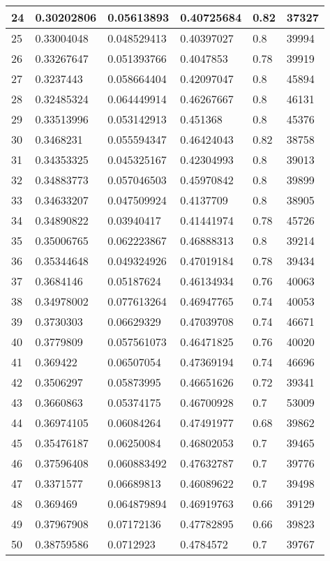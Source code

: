 \begin{longtable}{|l|l|l|l|l|l|}
24 & 0.30202806 & 0.05613893 & 0.40725684 & 0.82 & 37327 \\ \hline 
25 & 0.33004048 & 0.048529413 & 0.40397027 & 0.8 & 39994 \\ \hline 
26 & 0.33267647 & 0.051393766 & 0.4047853 & 0.78 & 39919 \\ \hline 
27 & 0.3237443 & 0.058664404 & 0.42097047 & 0.8 & 45894 \\ \hline 
28 & 0.32485324 & 0.064449914 & 0.46267667 & 0.8 & 46131 \\ \hline 
29 & 0.33513996 & 0.053142913 & 0.451368 & 0.8 & 45376 \\ \hline 
30 & 0.3468231 & 0.055594347 & 0.46424043 & 0.82 & 38758 \\ \hline 
31 & 0.34353325 & 0.045325167 & 0.42304993 & 0.8 & 39013 \\ \hline 
32 & 0.34883773 & 0.057046503 & 0.45970842 & 0.8 & 39899 \\ \hline 
33 & 0.34633207 & 0.047509924 & 0.4137709 & 0.8 & 38905 \\ \hline 
34 & 0.34890822 & 0.03940417 & 0.41441974 & 0.78 & 45726 \\ \hline 
35 & 0.35006765 & 0.062223867 & 0.46888313 & 0.8 & 39214 \\ \hline 
36 & 0.35344648 & 0.049324926 & 0.47019184 & 0.78 & 39434 \\ \hline 
37 & 0.3684146 & 0.05187624 & 0.46134934 & 0.76 & 40063 \\ \hline 
38 & 0.34978002 & 0.077613264 & 0.46947765 & 0.74 & 40053 \\ \hline 
39 & 0.3730303 & 0.06629329 & 0.47039708 & 0.74 & 46671 \\ \hline 
40 & 0.3779809 & 0.057561073 & 0.46471825 & 0.76 & 40020 \\ \hline 
41 & 0.369422 & 0.06507054 & 0.47369194 & 0.74 & 46696 \\ \hline 
42 & 0.3506297 & 0.05873995 & 0.46651626 & 0.72 & 39341 \\ \hline 
43 & 0.3660863 & 0.05374175 & 0.46700928 & 0.7 & 53009 \\ \hline 
44 & 0.36974105 & 0.06084264 & 0.47491977 & 0.68 & 39862 \\ \hline 
45 & 0.35476187 & 0.06250084 & 0.46802053 & 0.7 & 39465 \\ \hline 
46 & 0.37596408 & 0.060883492 & 0.47632787 & 0.7 & 39776 \\ \hline 
47 & 0.3371577 & 0.06689813 & 0.46089622 & 0.7 & 39498 \\ \hline 
48 & 0.369469 & 0.064879894 & 0.46919763 & 0.66 & 39129 \\ \hline 
49 & 0.37967908 & 0.07172136 & 0.47782895 & 0.66 & 39823 \\ \hline 
50 & 0.38759586 & 0.0712923 & 0.4784572 & 0.7 & 39767 \\ \hline 
\end{longtable}
